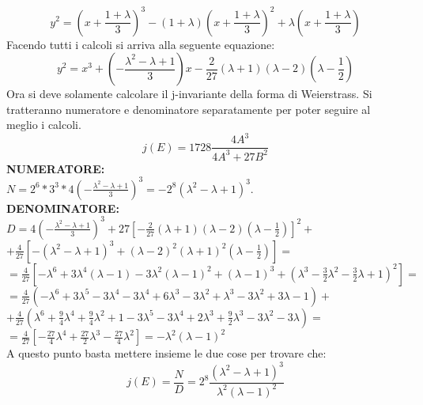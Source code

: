 \documentclass[a4paper]{article}
\newcommand{\ds}{\displaystyle}
\begin{document}
\begin{enumerate}
\begin{enumerate}
$$y^2=\ds{\left(x+\frac{1+\lambda}{3}\right)^3-(1+\lambda)\left(x+\frac{1+\lambda}{3}\right)^2+
\lambda\left(x+\frac{1+\lambda}{3}\right)}$$
Facendo tutti i calcoli si arriva alla seguente equazione:
$$y^2=x^3+\ds{\left(-\frac{\lambda^2-\lambda+1}{3}\right)x-\frac{2}{27}(\lambda+1)(\lambda-2)\left(\lambda-
\frac{1}{2}\right)}$$
Ora si deve solamente calcolare il j-invariante della forma di Weierstrass. Si tratteranno numeratore e denominatore 
separatamente per poter seguire al meglio i calcoli.
$$j(E)=1728\ds{\frac{4A^3}{4A^3+27B^2}}$$
\textbf{NUMERATORE:} \\
$N=2^6*3^3*4\ds{\left(-\frac{\lambda^2-\lambda+1}{3}\right)^3}=-2^8(\lambda^2-\lambda+1)^3$.\\  
\textbf{DENOMINATORE:} \\
$D=4\ds{\left(-\frac{\lambda^2-\lambda+1}{3}\right)^3
+27\left[-\frac{2}{27}(\lambda+1)(\lambda-2)\left(\lambda-\frac{1}{2}\right)\right]^2+}$\\
$+\ds{\frac{4}{27}\left[-(\lambda^2-\lambda+1)^3+(\lambda-2)^2(\lambda+1)^2\left(\lambda-\frac{1}{2}\right)\right]}=$\\
$=\ds{\frac{4}{27}\left[-\lambda^6+3\lambda^4(\lambda-1)-3\lambda^2(\lambda-1)^2+(\lambda-1)^3+
\left(\lambda^3-\frac{3}{2}\lambda^2-\frac{3}{2}\lambda+1\right)^2\right]=}$\\
$=\ds{\frac{4}{27}\left(-\lambda^6+3\lambda^5-3\lambda^4-3\lambda^4+6\lambda^3-3\lambda^2+\lambda^3-3\lambda^2+3\lambda-1\right)}+$\\
$+\ds{\frac{4}{27}\left(\lambda^6+\frac{9}{4}\lambda^4+\frac{9}{4}\lambda^2+1-3\lambda^5-3\lambda^4
+2\lambda^3+\frac{9}{2}\lambda^3-3\lambda^2-3\lambda\right)=}$\\
$=\ds{\frac{4}{27}\left[-\frac{27}{4}\lambda^4+\frac{27}{2}\lambda^3-\frac{27}{4}\lambda^2\right]=
-\lambda^2(\lambda-1)^2}$\\
A questo punto basta mettere insieme le due cose per trovare che:
$$j(E)=\ds{\frac{N}{D}=2^8\frac{(\lambda^2-\lambda+1)^3}{\lambda^2(\lambda-1)^2}}$$


\end{enumerate}
\end{enumerate}
\end{document}
